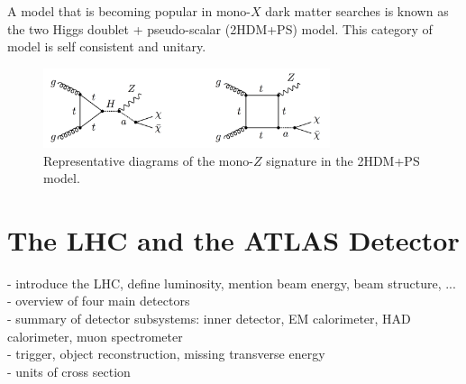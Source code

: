 A model that is becoming popular in mono-$X$ dark matter searches is known as the two Higgs doublet + pseudo-scalar (2HDM+PS) model. This category of model is self consistent and unitary.

\begin{figure}[htb]
\centering
\includegraphics[width=0.75\textwidth]{Figures/2hdma.png}
\caption{Representative diagrams of the mono-$Z$ signature in the 2HDM+PS model.}
\label{fig:2hdma}
\end{figure}


\section{The LHC and the ATLAS Detector}

- introduce the LHC, define luminosity, mention beam energy, beam structure, ...\\
- overview of four main detectors\\
- summary of detector subsystems: inner detector, EM calorimeter, HAD calorimeter, muon spectrometer\\
- trigger, object reconstruction, missing transverse energy\\
- units of cross section\\